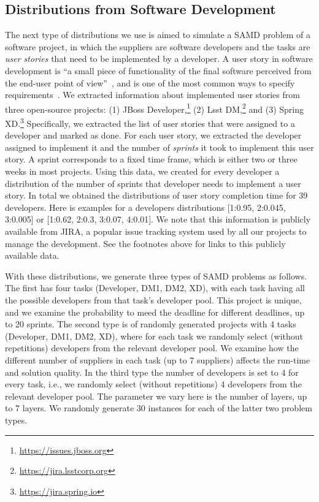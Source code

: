\documentclass[letterpaper]{article}
\newcommand{\samd}{\ac{SAMD}\xspace}
\begin{document}
\subsection{Distributions from Software Development}
The next type of distributions we use is aimed to simulate a \samd problem of a software project, in which the suppliers are software developers and the tasks are \emph{user stories} that need to be implemented by a developer. A user story in software development is ``a small piece of functionality of the final software perceived from the end-user point of view''~\cite{rees2002feasible},
and is one of the most common ways to specify requirements~\cite{kassab2015changing}. We extracted information about implemented user stories from three open-source projects: (1) JBoss Developer,\footnote{\url{https://issues.jboss.org}} (2) Lsst DM,\footnote{\url{https://jira.lsstcorp.org}} and (3) Spring XD.\footnote{\url{https://jira.spring.io}}
Specifically, we extracted the list of user stories that were assigned to a developer and marked as done. For each user story, we extracted the developer assigned to implement it and the number of \emph{sprints} it took to implement this user story. A sprint corresponds to a fixed time frame, which is either two or three weeks in most projects. Using this data, we created for every developer a distribution of the number of sprints that developer needs to implement a user story. In total we obtained the distributions of user story completion time for 39 developers. Here is examples for a developers distributions [1:0.95,	2:0.045, 3:0.005] or [1:0.62,	2:0.3,	3:0.07,	4:0.01].
We note that this information is publicly available from JIRA, a popular issue tracking system used by all our projects to manage the development. See the footnotes above for links to this publicly available data.


With these distributions, we generate three types of SAMD problems as follows. The first has four tasks (Developer, DM1, DM2, XD), with each task having all the possible developers from that task's developer pool. This project is unique, and we examine the probability to meed the deadline for different deadlines, up to 20 sprints. The second type is of randomly generated projects with 4 tasks (Developer, DM1, DM2, XD), where for each task we randomly select (without repetitions) developers from the relevant developer pool. We examine how the different number of suppliers in each task (up to 7 suppliers) affects the run-time and solution quality.
In the third type the number of developers is set to 4 for every task, i.e., we randomly select (without repetitions) 4 developers from the relevant developer pool. The parameter we vary here is the number of layers, up to 7 layers. We randomly generate 30 instances for each of the latter two problem types.
\end{document}
